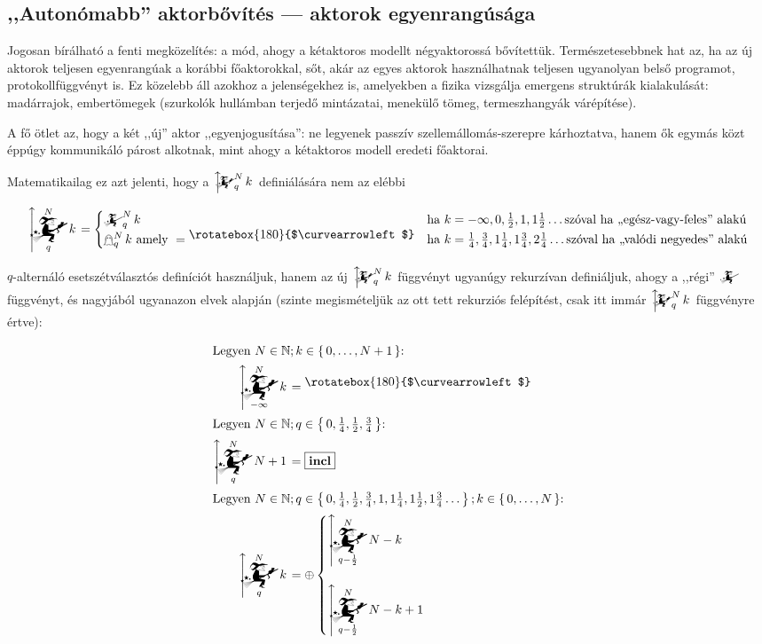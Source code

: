 \documentclass{article}
\newcommand{\nothing}{\text{\raisebox{0.4em}{\rotatebox{180}{$\curvearrowleft$}}}}%
\newcommand{\just}[1]{\boxed{#1}}%
\newcommand{\incl}{\mathbf{incl}}
\newcommand{\setOf}[1]{\left\lbrace\,#1\,\right\rbrace}
\newcommand{\mainfuncomm}[3]{\mathwitch_{#2}^{#1}#3}
\newcommand{\mainfunext}[3]{\left\uparrow\!\!\!\mathwitch*_{#2}^{#1}#3\right.}
\newcommand{\gbh}[3]{\mathop{\mathghost}^{#1}_{#2}#3}
\begin{document}
	\subsection{,,Autonómabb'' aktorbővítés --- aktorok egyenrangúsága}

	Jogosan bírálható a fenti megközelítés: a mód, ahogy a kétaktoros modellt négyaktorossá bővítettük.
	Természetesebbnek hat az, ha az új aktorok teljesen egyenrangúak a korábbi főaktorokkal, sőt, akár az egyes aktorok használhatnak teljesen ugyanolyan belső programot, protokollfüggvényt is.
	Ez közelebb áll azokhoz a jelenségekhez is, amelyekben a fizika vizsgálja emergens struktúrák kialakulását: madárrajok, embertömegek (szurkolók hullámban terjedő mintázatai, menekülő tömeg, termeszhangyák várépítése).

	A fő ötlet az, hogy a két ,,új'' aktor ,,egyenjogusítása'': ne legyenek passzív szellemállomás-szerepre kárhoztatva, hanem ők egymás közt éppúgy kommunikáló párost alkotnak, mint ahogy a kétaktoros modell eredeti főaktorai.

	Matematikailag ez azt jelenti, hogy a $\mainfunext Nqk$ definiálására nem az elébbi

	\[
		\mainfunext Nqk =
		\begin{cases}
			\mainfuncomm Nqk & \text{ha } k = -\infty, 0, \frac12, 1, 1\frac12\dots \text{szóval ha ,,egész-vagy-feles'' alakú}\\
			\gbh Nqk \text{ amely } =\nothing & \text{ha } k = \frac14, \frac34, 1\frac14, 1\frac34, 2\frac14\dots \text{szóval ha ,,valódi negyedes'' alakú}
		\end{cases}
	\]

	$q$-alternáló esetszétválasztós definíciót használjuk, hanem az új $\mainfunext Nqk$ függvényt ugyanúgy rekurzívan definiáljuk, ahogy a ,,régi'' $\mainfuncomm{}{}{}$ függvényt, és nagyjából ugyanazon elvek alapján (szinte megismételjük az ott tett rekurziós felépítést, csak itt immár $\mainfunext Nqk$ függvényre értve):


	\begin{align}
		\intertext{Legyen $N \in \mathbb N; k \in \setOf{0, \dots, N+1}$:}
		\mainfunext N{-\infty}k &= \nothing
		\\\intertext{Legyen $N \in \mathbb N; q \in \setOf{0, \frac14, \frac12, \frac34}$:}
		\mainfunext Nq{N+1} &= \just\incl
		\\\intertext{Legyen $N \in \mathbb N; q \in \setOf{0, \frac14, \frac12, \frac34, 1, 1\frac14, 1\frac12, 1\frac34 \dots}; k \in \setOf{0, \dots, N}$:}
		\mainfunext Nqk &= \oplus\begin{cases}\displaystyle\mainfunext N{q-\frac12}{N-k}&\\\\\displaystyle\mainfunext N{q-\frac12}{N-k+1}&\end{cases}
	\end{align}
\end{document}
